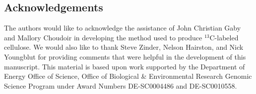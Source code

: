 \subsection{Acknowledgements} The authors would like to acknowledge the
assistance of John Christian Gaby and Mallory Choudoir in developing the method
used to produce $^{13}$C-labeled cellulose. We would also like to thank
Steve Zinder, Nelson Hairston, and Nick Youngblut for providing comments that
were helpful in the development of this manuscript. This material is based upon
work supported by the Department of Energy Office of Science, Office of
Biological \& Environmental Research Genomic Science Program under Award Numbers
DE-SC0004486 and DE-SC0010558.

